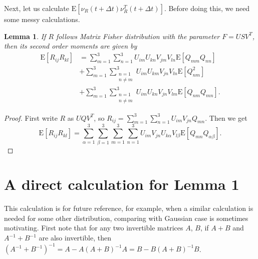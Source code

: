 \documentclass[10pt]{article}
\newtheorem{lemma}{Lemma}
\newcommand{\expect}[1]{\ensuremath{\mathrm{E}\left[ #1 \right]}}
\begin{document}
Next, let us calculate $\expect{\nu_R(t+\Delta t)\nu_R^T(t+\Delta t)}$. Before doing this, we need some messy calculations.
\begin{lemma}
	If $R$ follows Matrix Fisher distribution with the parameter $F=USV^T$, then its second order moments are given by
	\begin{align}
		\expect{R_{ij}R_{kl}} &= \sum_{m=1}^{3}\sum_{n=1}^{3}U_{im}U_{kn}V_{jm}V_{ln}\expect{Q_{mm}Q_{nn}} \nonumber \\
		&+ \sum_{m=1}^{3}\sum_{\substack{n=1\\n\neq m}}^{3}U_{im}U_{km}V_{jn}V_{ln}\expect{Q_{nm}^2} \nonumber \\
		&+ \sum_{m=1}^{3}\sum_{\substack{n=1\\n\neq m}}^{3}U_{im}U_{kn}V_{jn}V_{lm}\expect{Q_{nm}Q_{mn}}.
	\end{align}
\end{lemma}
\begin{proof}
	First write $R$ as $UQV^T$, so $R_{ij} = \sum_{m=1}^{3}\sum_{n=1}^{3}U_{im}V_{jn}Q_{mn}$.
	Then we get
	\begin{equation*}
		\expect{R_{ij}R_{kl}} = \sum_{\alpha=1}^{3}\sum_{\beta=1}^{3}\sum_{m=1}^{3}\sum_{n=1}^{3}U_{im}V_{jn}U_{k\alpha}V_{l\beta}\expect{Q_{mn}Q_{\alpha\beta}}.
	\end{equation*}
\end{proof}

\appendix
\section{A direct calculation for Lemma 1}
This calculation is for future reference, for example, when a similar calculation is needed for some other distribution, comparing with Gaussian case is sometimes motivating.
First note that for any two invertible matrices $A$, $B$, if $A+B$ and $A^{-1}+B^{-1}$ are also invertible, then $(A^{-1}+B^{-1})^{-1} = A-A(A+B)^{-1}A = B-B(A+B)^{-1}B$.
\end{document}

